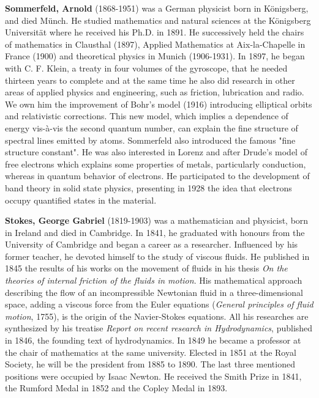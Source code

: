 \textbf{Sommerfeld, Arnold} (1868-1951) was a German physicist born in Königsberg, and died Münch. He studied mathematics and natural sciences at the Königsberg Universität where he received his Ph.D. in 1891. He successively held the chairs of mathematics in Clausthal (1897), Applied Mathematics at Aix-la-Chapelle in France (1900) and theoretical physics in Munich (1906-1931). In 1897, he began with C. F. Klein, a treaty in four volumes of the gyroscope, that he needed thirteen years to complete and at the same time he also did research in other areas of applied physics and engineering, such as friction, lubrication and radio. We own him the improvement of Bohr's model (1916) introducing elliptical orbits and relativistic corrections. This new model, which implies a dependence of energy vis-à-vis the second quantum number, can explain the fine structure of spectral lines emitted by atoms. Sommerfeld also introduced the famous "fine structure constant". He was also interested in Lorenz and after Drude's model of free electrons which explains some properties of metals, particularly conduction, whereas in quantum behavior of electrons. He participated to the development of band theory in solid state physics, presenting in 1928 the idea that electrons occupy quantified states in the material.

\textbf{Stokes, George Gabriel} (1819-1903) was a mathematician and physicist, born in Ireland and died in Cambridge. In 1841, he graduated with honours from the University of Cambridge and began a career as a researcher. Influenced by his former teacher, he devoted himself to the study of viscous fluids. He published in 1845 the results of his works on the movement of fluids in his thesis \textit{On the theories of internal friction of the fluids in motion}. His mathematical approach describing the flow of an incompressible Newtonian fluid in a three-dimensional space, adding a viscous force from the Euler equations (\textit{General principles of fluid motion}, 1755), is the origin of the Navier-Stokes equations. All his researches are synthesized by his treatise \textit{Report on recent research in Hydrodynamics}, published in 1846, the founding text of hydrodynamics. In 1849 he became a professor at the chair of mathematics at the same university. Elected in 1851 at the Royal Society, he will be the president from 1885 to 1890. The last three mentioned positions were occupied by Isaac Newton. He received the Smith Prize in 1841, the Rumford Medal in 1852 and the Copley Medal in 1893.

